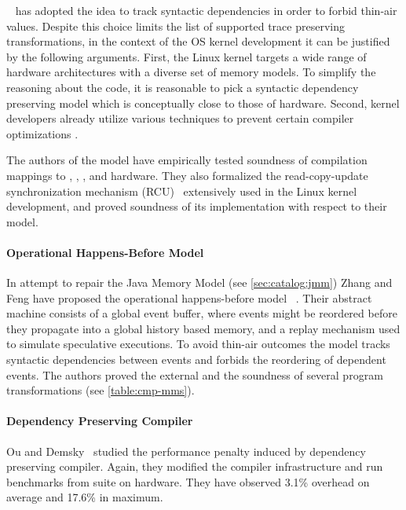 \LKMM~\cite{Alglave-al:ASPLOS18} has adopted 
the idea to track syntactic dependencies in order to 
forbid thin-air values. Despite this choice 
limits the list of supported trace preserving transformations,
in the context of the OS kernel development 
it can be justified by the following arguments. 
First, the Linux kernel targets 
a wide range of hardware architectures with a diverse
set of memory models. To simplify the reasoning about the code, 
it is reasonable to pick a syntactic dependency preserving
model which is conceptually close to those of hardware. 
Second, kernel developers already utilize 
various techniques to prevent certain compiler optimizations%
\cite{Alglave-al:ASPLOS18, LK-MemBarriers, LK-RCU-Deref}.

The authors of the model have empirically tested 
soundness of compilation mappings to 
\Intel, , , and \POWER hardware. 
They also formalized the read-copy-update 
synchronization mechanism (RCU)~\cite{McKenney-RCU2007} 
extensively used in the Linux kernel development, 
and proved soundness of its implementation with respect to their model.

\paragraph{Operational Happens-Before Model}

In attempt to repair the Java Memory Model (see \cref{sec:catalog:jmm})
Zhang and Feng have proposed the 
operational happens-before model \OHMM~\cite{Zhang-Feng:FCS16}.
Their abstract machine consists of a global event buffer,
where events might be reordered before they propagate into  
a global history based memory, and a replay mechanism 
used to simulate speculative executions. 
To avoid thin-air outcomes the model tracks syntactic dependencies 
between events and forbids the reordering of dependent events. 
The authors proved the external \DRF and 
the soundness of several program transformations
(see \cref{table:cmp-mms}). 

\paragraph{Dependency Preserving Compiler}

Ou and Demsky~\cite{Ou-Demsky:OOPSLA18} studied 
the performance penalty induced by dependency preserving compiler. 
Again, they modified the \LLVM compiler infrastructure 
and run benchmarks from \SPECCPU suite on  hardware. 
They have observed 3.1\% overhead on average and 17.6\% in maximum. 

